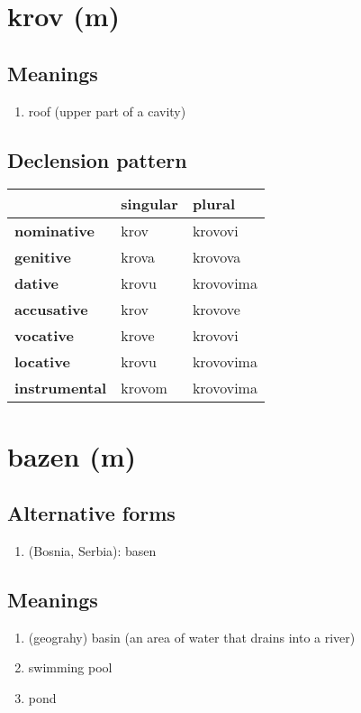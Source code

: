 \filbreak
\section{krov (m)}
\subsection*{Meanings}
\begin{enumerate}
\item roof (upper part of a cavity)
\end{enumerate}
\subsection*{Declension pattern}
\begin{tabularx}{\linewidth}{Xll}
\toprule
{} & singular &     plural \\
\midrule
\textbf{nominative  } &     krov &    krovovi \\
\textbf{genitive    } &    krova &    krovova \\
\textbf{dative      } &    krovu &  krovovima \\
\textbf{accusative  } &     krov &    krovove \\
\textbf{vocative    } &    krove &    krovovi \\
\textbf{locative    } &    krovu &  krovovima \\
\textbf{instrumental} &   krovom &  krovovima \\
\bottomrule
\end{tabularx}

\filbreak
\section{bazen (m)}
\subsection*{Alternative forms}
\begin{enumerate}
\item (Bosnia, Serbia): basen
\end{enumerate}
\subsection*{Meanings}
\begin{enumerate}
\item (geograhy) basin (an area of water that drains into a river)
\item swimming pool
\item pond
\end{enumerate}
